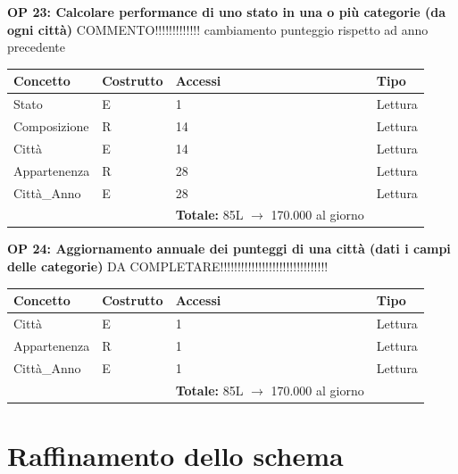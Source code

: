 \documentclass[a4paper,12pt]{report}
\begin{document}
            \textbf{OP 23: Calcolare performance di uno stato in una o più categorie (da ogni città)}
            COMMENTO!!!!!!!!!!!!! cambiamento punteggio rispetto ad anno precedente
        	\begin{table}[H]
            \centering
             \begin{tabular}{llll}
             \rowcolor{yellow!20} \textbf{Concetto} & \textbf{Costrutto} & \textbf{Accessi} & \textbf{Tipo}\\ [0.5ex] 
             \hline
             Stato & E & 1 & Lettura \\ 
             Composizione & R & 14 & Lettura \\ 
             Città & E & 14 & Lettura \\ 
             Appartenenza & R & 28 & Lettura \\ 
             Città\_Anno & E & 28 & Lettura \\ 
             \hline
                \rowcolor{yellow!20} &   & \textbf{Totale:} 85L $\rightarrow$ 170.000 al giorno &  \\ [1ex] 
             
             \end{tabular}
            \end{table}

            \textbf{OP 24: Aggiornamento annuale dei punteggi di una città (dati i campi delle categorie)}
            DA COMPLETARE!!!!!!!!!!!!!!!!!!!!!!!!!!!!!!!
        	\begin{table}[H]
            \centering
             \begin{tabular}{llll}
             \rowcolor{yellow!20} \textbf{Concetto} & \textbf{Costrutto} & \textbf{Accessi} & \textbf{Tipo}\\ [0.5ex] 
             \hline
             Città & E & 1 & Lettura \\ 
             Appartenenza & R & 1 & Lettura \\ 
             Città\_Anno & E & 1 & Lettura \\ 
             \hline
                \rowcolor{yellow!20} &   & \textbf{Totale:} 85L $\rightarrow$ 170.000 al giorno &  \\ [1ex] 
             
             \end{tabular}
            \end{table}
        
        \section{Raffinamento dello schema}
\end{document}
